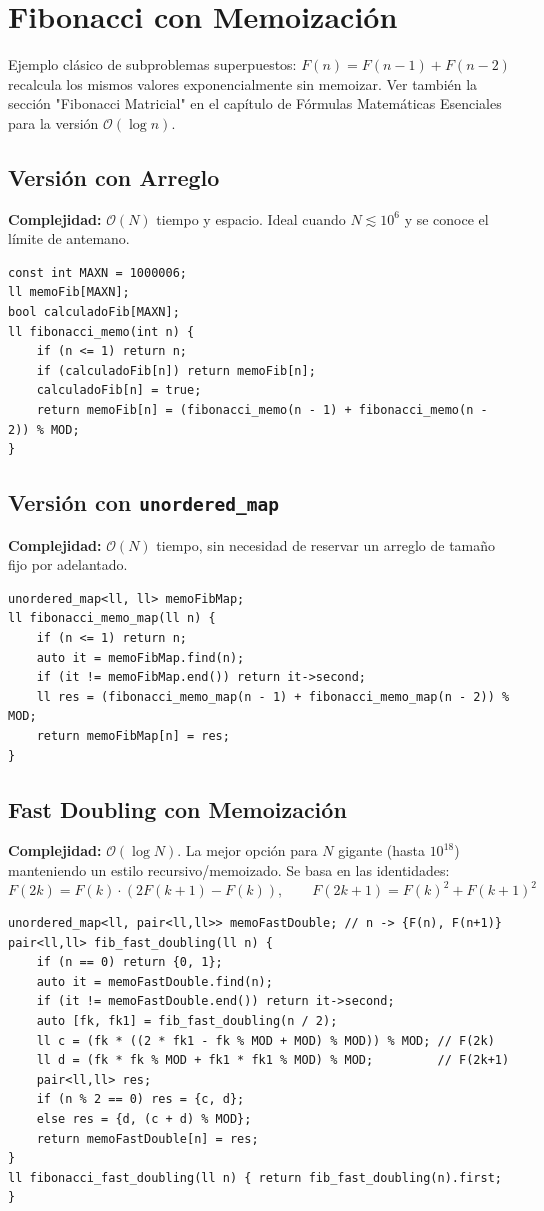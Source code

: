 \documentclass[10pt,twocolumn,letterpaper]{report}
\begin{document}
\section{Fibonacci con Memoización}
Ejemplo clásico de subproblemas superpuestos: $F(n) = F(n-1) + F(n-2)$ recalcula los mismos valores exponencialmente sin memoizar. Ver también la sección "Fibonacci Matricial" en el capítulo de Fórmulas Matemáticas Esenciales para la versión $\mathcal{O}(\log n)$.

\subsection{Versión con Arreglo}
\textbf{Complejidad:} $\mathcal{O}(N)$ tiempo y espacio. Ideal cuando $N \lesssim 10^6$ y se conoce el límite de antemano.
\begin{lstlisting}
const int MAXN = 1000006;
ll memoFib[MAXN];
bool calculadoFib[MAXN];
ll fibonacci_memo(int n) {
    if (n <= 1) return n;
    if (calculadoFib[n]) return memoFib[n];
    calculadoFib[n] = true;
    return memoFib[n] = (fibonacci_memo(n - 1) + fibonacci_memo(n - 2)) % MOD;
}
\end{lstlisting}

\subsection{Versión con \texttt{unordered\_map}}
\textbf{Complejidad:} $\mathcal{O}(N)$ tiempo, sin necesidad de reservar un arreglo de tamaño fijo por adelantado.
\begin{lstlisting}
unordered_map<ll, ll> memoFibMap;
ll fibonacci_memo_map(ll n) {
    if (n <= 1) return n;
    auto it = memoFibMap.find(n);
    if (it != memoFibMap.end()) return it->second;
    ll res = (fibonacci_memo_map(n - 1) + fibonacci_memo_map(n - 2)) % MOD;
    return memoFibMap[n] = res;
}
\end{lstlisting}

\subsection{Fast Doubling con Memoización}
\textbf{Complejidad:} $\mathcal{O}(\log N)$. La mejor opción para $N$ gigante (hasta $10^{18}$) manteniendo un estilo recursivo/memoizado. Se basa en las identidades:
\[
F(2k) = F(k)\cdot(2F(k+1)-F(k)), \qquad F(2k+1) = F(k)^2 + F(k+1)^2
\]
\begin{lstlisting}
unordered_map<ll, pair<ll,ll>> memoFastDouble; // n -> {F(n), F(n+1)}
pair<ll,ll> fib_fast_doubling(ll n) {
    if (n == 0) return {0, 1};
    auto it = memoFastDouble.find(n);
    if (it != memoFastDouble.end()) return it->second;
    auto [fk, fk1] = fib_fast_doubling(n / 2);
    ll c = (fk * ((2 * fk1 - fk % MOD + MOD) % MOD)) % MOD; // F(2k)
    ll d = (fk * fk % MOD + fk1 * fk1 % MOD) % MOD;         // F(2k+1)
    pair<ll,ll> res;
    if (n % 2 == 0) res = {c, d};
    else res = {d, (c + d) % MOD};
    return memoFastDouble[n] = res;
}
ll fibonacci_fast_doubling(ll n) { return fib_fast_doubling(n).first; }
\end{lstlisting}
\end{document}
